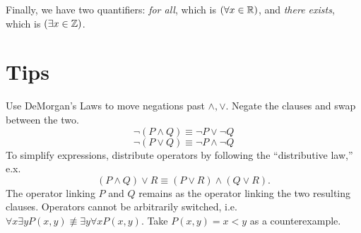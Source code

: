 \documentclass[11 pt]{scrartcl}
\begin{document}
Finally, we have two quantifiers: \emph{for all}, which is $(\forall x\in \mathbb R)$, and \emph{there exists}, which is $(\exists x \in \mathbb Z)$. 

\section{Tips}
\begin{itemize}
    \ii Use DeMorgan's Laws to move negations past $\wedge, \vee$. Negate the clauses and swap between the two. 
    \[ \neg(P\wedge Q) \equiv \neg P \vee \neg Q \] 
    \[ \neg(P\vee Q) \equiv \neg P \wedge \neg Q \] 
    \ii To simplify expressions, distribute operators by following the ``distributive law,'' e.x. 
    \[ (P \wedge Q) \vee R \equiv (P \vee R) \wedge (Q \vee R).\] 
    The operator linking $P$ and $Q$ remains as the operator linking the two resulting clauses.  
    \ii Operators cannot be arbitrarily switched, i.e. $\forall x \exists y P(x,y) \not\equiv \exists y \forall x P(x,y)$. Take $P(x,y) = x < y$ as a counterexample. 
\end{itemize}
\end{document}
